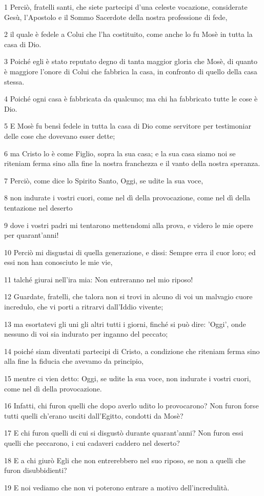 \par 1 Perciò, fratelli santi, che siete partecipi d'una celeste vocazione, considerate Gesù, l'Apostolo e il Sommo Sacerdote della nostra professione di fede,
\par 2 il quale è fedele a Colui che l'ha costituito, come anche lo fu Mosè in tutta la casa di Dio.
\par 3 Poiché egli è stato reputato degno di tanta maggior gloria che Mosè, di quanto è maggiore l'onore di Colui che fabbrica la casa, in confronto di quello della casa stessa.
\par 4 Poiché ogni casa è fabbricata da qualcuno; ma chi ha fabbricato tutte le cose è Dio.
\par 5 E Mosè fu bensì fedele in tutta la casa di Dio come servitore per testimoniar delle cose che dovevano esser dette;
\par 6 ma Cristo lo è come Figlio, sopra la sua casa; e la sua casa siamo noi se riteniam ferma sino alla fine la nostra franchezza e il vanto della nostra speranza.
\par 7 Perciò, come dice lo Spirito Santo, Oggi, se udite la sua voce,
\par 8 non indurate i vostri cuori, come nel dì della provocazione, come nel dì della tentazione nel deserto
\par 9 dove i vostri padri mi tentarono mettendomi alla prova, e videro le mie opere per quarant'anni!
\par 10 Perciò mi disgustai di quella generazione, e dissi: Sempre erra il cuor loro; ed essi non han conosciuto le mie vie,
\par 11 talché giurai nell'ira mia: Non entreranno nel mio riposo!
\par 12 Guardate, fratelli, che talora non si trovi in alcuno di voi un malvagio cuore incredulo, che vi porti a ritrarvi dall'Iddio vivente;
\par 13 ma esortatevi gli uni gli altri tutti i giorni, finché si può dire: 'Oggi', onde nessuno di voi sia indurato per inganno del peccato;
\par 14 poiché siam diventati partecipi di Cristo, a condizione che riteniam ferma sino alla fine la fiducia che avevamo da principio,
\par 15 mentre ci vien detto: Oggi, se udite la sua voce, non indurate i vostri cuori, come nel dì della provocazione.
\par 16 Infatti, chi furon quelli che dopo averlo udito lo provocarono? Non furon forse tutti quelli ch'erano usciti dall'Egitto, condotti da Mosè?
\par 17 E chi furon quelli di cui si disgustò durante quarant'anni? Non furon essi quelli che peccarono, i cui cadaveri caddero nel deserto?
\par 18 E a chi giurò Egli che non entrerebbero nel suo riposo, se non a quelli che furon disubbidienti?
\par 19 E noi vediamo che non vi poterono entrare a motivo dell'incredulità.

